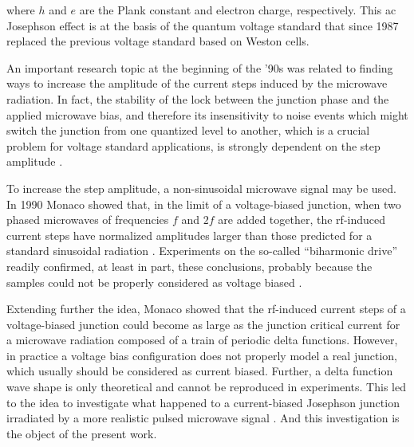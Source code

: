 where $h$ and $e$ are the Plank constant and electron charge, respectively. This ac Josephson effect is at the basis of the quantum voltage standard that since 1987 replaced the previous voltage standard based on Weston cells.



An important research topic at the beginning of the '90s was related to finding ways to increase the amplitude of the current steps induced by the microwave radiation. In fact, the stability of the lock between the junction phase and the applied microwave bias, and therefore its insensitivity to noise events which might switch the junction from one quantized level to another, which is a crucial problem for voltage standard applications, is strongly dependent on the step amplitude \cite{Kautz:1987}.

To increase the step amplitude, a non-sinusoidal microwave signal may be used.
In 1990 Monaco showed that, in the limit of a voltage-biased junction, when two phased microwaves of frequencies $f$ and $2 f$ are added together, the rf-induced current steps have normalized amplitudes larger than those predicted for a standard sinusoidal radiation \cite{Monaco:1990}. 
Experiments on the so-called ``biharmonic drive'' readily confirmed, at least in part, these conclusions, probably because the samples could not be properly considered as voltage biased \cite{Andreone:1991, Andreone:1992}.

Extending further the idea, Monaco showed that the rf-induced current steps of a voltage-biased junction could become as large as the junction critical current for a microwave radiation composed of a train of periodic delta functions.
However, in practice a voltage bias configuration does not properly model a real junction, which usually should be considered as current biased.
Further, a delta function wave shape is only theoretical and cannot be reproduced in experiments. This led to the idea to investigate what happened to a current-biased Josephson junction irradiated by a more realistic pulsed microwave signal \cite{Maggi:1996, Maggi:1997}. And this investigation is the object of the present work.


